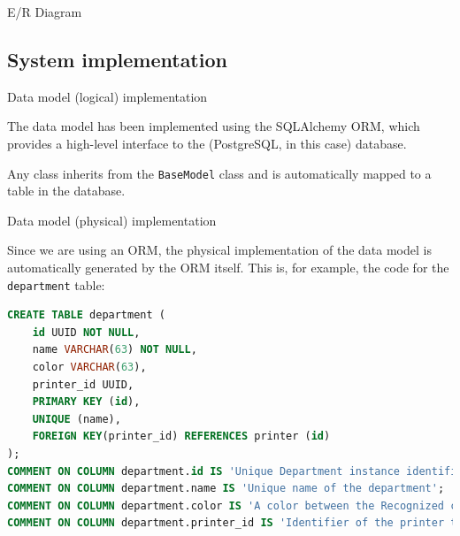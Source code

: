 \begin{frame}[allowframebreaks]{E/R Diagram}
\end{frame}

\subsection{System implementation}

\begin{frame}[allowframebreaks]{Data model (logical) implementation}

	The data model has been implemented using the SQLAlchemy ORM, which
	provides a high-level interface to the (PostgreSQL, in this case) database.

	

	Any class inherits from the \texttt{BaseModel} class and is automatically
	mapped to a table in the database.

	\framebreak

	\vspace*{-1\baselineskip}
	

\end{frame}

\begin{frame}[fragile]{Data model (physical) implementation}

	Since we are using an ORM, the physical implementation of the data model is
	automatically generated by the ORM itself.
	This is, for example, the code for the \texttt{department} table:

	\begin{lstlisting}[language=SQL]
CREATE TABLE department (
	id UUID NOT NULL,
	name VARCHAR(63) NOT NULL,
	color VARCHAR(63),
	printer_id UUID,
	PRIMARY KEY (id),
	UNIQUE (name),
	FOREIGN KEY(printer_id) REFERENCES printer (id)
);
COMMENT ON COLUMN department.id IS 'Unique Department instance identifier';
COMMENT ON COLUMN department.name IS 'Unique name of the department';
COMMENT ON COLUMN department.color IS 'A color between the Recognized color keyword names. See also https://www.w3.org/TR/SVG11/types.html#ColorKeywords';
COMMENT ON COLUMN department.printer_id IS 'Identifier of the printer the department is equipped with';\end{lstlisting}

\end{frame}

